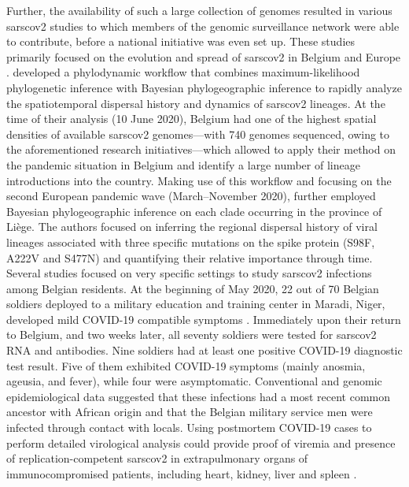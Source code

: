 Further, the availability of such a large collection of genomes resulted in various \gls{sarscov2} studies to which members of the genomic surveillance network were able to contribute, before a national initiative was even set up.
These studies primarily focused on the evolution and spread of \gls{sarscov2} in Belgium and Europe \citep{alm2020geographical}.
\citet{dellicour2021phylodynamic} developed a phylodynamic workflow that combines maximum-likelihood phylogenetic inference with Bayesian phylogeographic inference to rapidly analyze the spatiotemporal dispersal history and dynamics of \gls{sarscov2} lineages.
At the time of their analysis (10 June 2020), Belgium had one of the highest spatial densities of available \gls{sarscov2} genomes—with 740 genomes sequenced, owing to the aforementioned research initiatives—which allowed \citet{dellicour2021phylodynamic} to apply their method on the pandemic situation in Belgium and identify a large number of lineage introductions into the country.
Making use of this workflow and focusing on the second European pandemic wave (March--November 2020), \citet{bollen2021exploiting} further employed Bayesian phylogeographic inference on each clade occurring in the province of Li\`{e}ge.
The authors focused on inferring the regional dispersal history of viral lineages associated with three specific mutations on the spike protein (S98F, A222V and S477N) and quantifying their relative importance through time.
Several studies focused on very specific settings to study \gls{sarscov2} infections among Belgian residents.
At the beginning of May 2020, 22 out of 70 Belgian soldiers deployed to a military education and training center in Maradi, Niger, developed mild COVID-19 compatible symptoms \citep{pirnay2020study}.
Immediately upon their return to Belgium, and two weeks later, all seventy soldiers were tested for \gls{sarscov2} RNA and antibodies.
Nine soldiers had at least one positive COVID-19 diagnostic test result.
Five of them exhibited COVID-19 symptoms (mainly anosmia, ageusia, and fever), while four were asymptomatic.
Conventional and genomic epidemiological data suggested that these infections had a most recent common ancestor with African origin and that the Belgian military service men were infected through contact with locals.
Using postmortem COVID-19 cases to perform detailed virological analysis could provide proof of viremia and presence of replication-competent \gls{sarscov2} in extrapulmonary organs of immunocompromised patients, including heart, kidney, liver and spleen \citep{vancleemput2021organ-specific}.
